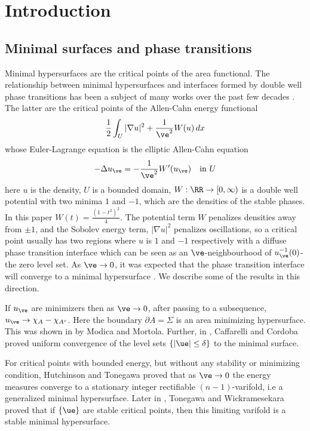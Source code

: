 \section{Introduction}


\subsection{Minimal surfaces and phase transitions} Minimal hypersurfaces are the critical points of the area functional. The relationship between minimal hypersurfaces and interfaces formed by double well phase transitions has been a subject of many works over the past few decades \cite{g,gg,ht,m,st,tw}. The latter are the critical points of the Allen-Cahn energy functional
\begin{equation} \label{ace}
    \frac{1}{2}\int_U |\nabla u|^2 + \frac{1}{\ve ^2} W(u) \,dx
\end{equation}
whose Euler-Lagrange equation is the elliptic Allen-Cahn equation 
\begin{equation} \label{ac}
    -\Delta u_{\ve} = -\frac{1}{\ve ^2} W'(u_{\ve})  \quad \text{in } U 
\end{equation}
here $u$ is the density, $U$ is a bounded domain, $W: \RR \to [0,\infty)$ is a double well potential with two minima $1$ and $-1$, which are the densities of the stable phases. In this paper $W(t)=\frac{(1-t^2)^2}{4}$. The potential term $W$ penalizes densities away from $\pm 1$, and the Sobolev energy term, $|\nabla u|^2$ penalizes oscillations, so a critical point usually has two regions where $u$ is $1$ and $-1$ respectively with a diffuse phase transition interface which can be seen as an $\ve$-neighbourhood of $u_{\ve}^{-1}(0)$-the zero level set. As $\ve \to 0$, it was expected that the phase transition interface will converge to a minimal hypersurface \cite{i}. We describe some of the results in this direction.


If $u_\ve$ are minimizers then as $\ve \to 0$, after passing to a subsequence, $u_\ve \to \chi_A - \chi_{A^c}$. Here the boundary $\partial A = \Sigma$ is an area minimizing hypersurface. This was shown in \cite{mm} by Modica and Mortola. Further, in \cite{cc}, Caffarelli and Cordoba proved uniform convergence of the level sets 
    $\{|\ue| \leq \delta\}$ to the minimal surface.

For critical points with bounded energy, but without any stability or minimizing condition, Hutchinson and Tonegawa \cite{ht} proved that as $\ve \to 0$ the energy measures converge to a stationary integer rectifiable $(n-1)$-varifold, i.e a generalized minimal hypersurface. Later in \cite{tw}, Tonegawa and Wickramesekara proved that if $\{\ue\}$ are stable critical points, then this limiting varifold is a stable minimal hypersurface. 


